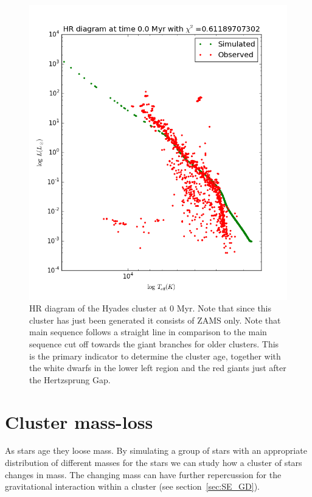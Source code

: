 \documentclass{aa}
\begin{document}
\begin{figure}
    \centering
    \includegraphics[width=\hsize]{img/test0.png}
    \caption{HR diagram of the Hyades cluster at 0 Myr. Note that since this cluster has just been generated it consists of ZAMS only. Note that main sequence follows a straight line in comparison to the main sequence cut off towards the giant branches for older clusters. This is the primary indicator to determine the cluster age, together with the white dwarfs in the lower left region and the red giants just after the Hertzsprung Gap.}\label{fig:ZAMS}
\end{figure}


\section{Cluster mass-loss} \label{sec:massloss}
As stars age they loose mass. By simulating a group of stars with an appropriate distribution of different masses for the stars we can study how a cluster of stars changes in mass. The changing mass can have further repercussion for the gravitational interaction within a cluster (see section~\ref{sec:SE_GD}). 
\end{document}
